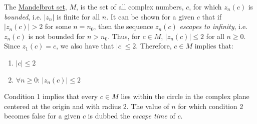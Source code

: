 \documentclass[addpoints]{exam}
\begin{document}
\begin{questions}
  The \href{http://en.wikipedia.org/wiki/Mandelbrot_set}{Mandelbrot set}, $M$, is the set of all complex numbers, $c$, for which $z_n(c)$ is \textit{bounded}, i.e. $|z_n|$ is finite for all $n$. It can be shown for a given $c$ that if $|z_{n}(c)| > 2$ for some $n = n_0$, then the sequence $z_n(c)$ {\it escapes to infinity}, i.e. $z_n(c)$ is not bounded for $n > n_0$. Thus, for $c\in M$, $|z_n(c)| \leq 2$ for all $n\geq 0$. Since $z_1(c) = c$, we also have that $|c| \leq 2$. Therefore, $c\in M$ implies that:
  \begin{enumerate}
  \item $|c|\leq 2$
  \item $\forall n\geq 0:\, |z_n(c)|\leq 2$
  \end{enumerate}
  Condition 1 implies that every $c\in M$ lies within the circle in the complex plane centered at the origin and with radius 2. The value of $n$ for which condition 2 becomes false for a given $c$ is dubbed the {\it escape time} of $c$.


\end{questions}
\end{document}
